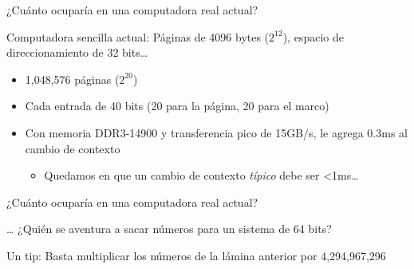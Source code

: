 \documentclass[presentation]{beamer}
\newcommand{\rarrow}{$\rightarrow$\hskip 0.5em}
\begin{document}
\begin{frame}[label={sec:orgc1a2ed7}]{¿Cuánto ocuparía en una computadora real actual?}
\begin{center}
Computadora sencilla actual: Páginas de 4096 bytes (\(2^{12}\)), espacio
de direccionamiento de 32 bits\ldots{}
\end{center}
\pause
\begin{itemize}
\item 1,048,576 páginas (\(2^{20}\))
\end{itemize}
\pause
\begin{itemize}
\item Cada entrada de 40 bits (20 para la página, 20 para el marco)
\end{itemize}
\pause
{}
\pause
{}
\pause
\begin{itemize}
\item Con memoria DDR3-14900 y transferencia pico de 15GB/s, le agrega
0.3ms al cambio de contexto
\begin{itemize}
\item Quedamos en que un cambio de contexto \emph{típico} debe ser <1ms\ldots{}
\end{itemize}
\end{itemize}
\end{frame}
\begin{frame}[label={sec:orgbb033fd}]{¿Cuánto ocuparía en una computadora real actual?}
\begin{center}
\ldots{} ¿Quién se aventura a sacar números para un sistema de 64 bits?

\pause

Un tip: Basta multiplicar los números de la lámina anterior por
4,294,967,296
\end{center}
\end{frame}
\end{document}
